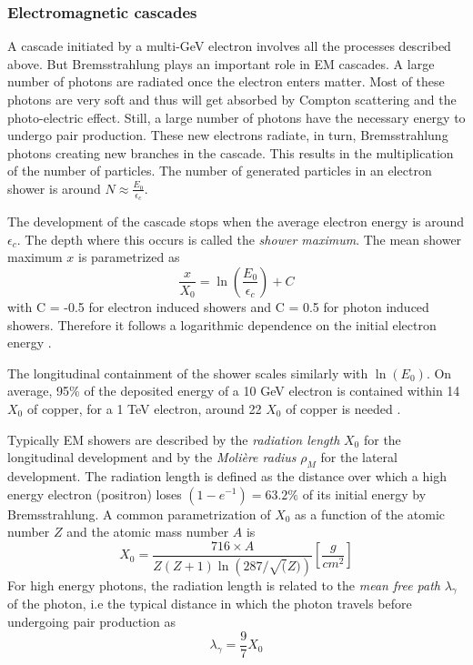 \subsubsection{Electromagnetic cascades}
\label{subsubsec:EMcascade}

A cascade initiated by a multi-GeV electron involves all the processes described above. But Bremsstrahlung plays an important role in EM cascades. A large number of photons are radiated once the electron enters matter. Most of these photons are very soft and thus will get absorbed by Compton scattering and the photo-electric effect. Still, a large number of photons have the necessary energy to undergo pair production. These new electrons radiate, in turn, Bremsstrahlung photons creating new branches in the cascade. This results in the multiplication of the number of particles. The number of generated particles in an electron shower is around $N \approx \frac{E_0}{\epsilon_{c}}$.

The development of the cascade stops when the average electron energy is around $\epsilon_{c}$. The depth where this occurs is called the \textit{shower maximum}. The mean shower maximum $x$ is parametrized as
\begin{equation}
  \frac{x}{X_0} = \ln\left(\frac{E_0}{\epsilon_{c}}\right) + C
\end{equation}
with C = -0.5 for electron induced showers and C = 0.5 for photon induced showers. Therefore it follows a logarithmic dependence on the initial electron energy \cite{Wigmans:392793}.

The longitudinal containment of the shower scales similarly with $\ln\left(E_0\right)$. On average, 95\% of the deposited energy of a 10 GeV electron is contained within 14 $X_0$ of copper, for a 1 TeV electron, around 22 $X_0$ of copper is needed \cite{Wigmans:392793}.

Typically EM showers are described by the \textit{radiation length} $X_0$ for the longitudinal development and by the \textit{Moli\`ere radius} $\rho_{M}$ for the lateral development. The radiation length is defined as the distance over which a high energy electron (positron) loses $(1 - e^{-1}) = 63.2\%$ of its initial energy by Bremsstrahlung. A common parametrization of $X_0$ as a function of the atomic number $Z$ and the atomic mass number $A$ is \cite{Wigmans:392793}
\begin{equation}
  X_0 = \frac{716 \times A}{Z(Z+1)\ln\left(287/\sqrt(Z)\right)} [\frac{g}{cm^2}]
\end{equation}
For high energy photons, the radiation length is related to the \textit{mean free path} $\lambda_{\gamma}$ of the photon, i.e the typical distance in which the photon travels before undergoing pair production as
\begin{equation}
  \lambda_{\gamma} = \frac{9}{7} X_0
\end{equation}

